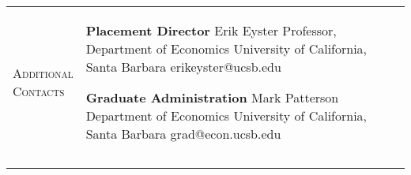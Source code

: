 \documentclass[11pt]{article}
\begin{document}
\begin{tabularx}{\textwidth}{@{}Y Z@{}}
	\textsc{Additional \newline Contacts}  & 
	\begin{minipage}[t]{0.41\textwidth}
		\textbf{Placement Director} \newline
		Erik Eyster \newline
		Professor, Department of Economics \newline
		University of California, Santa Barbara \newline
		erikeyster@ucsb.edu
	\end{minipage}\begin{minipage}[t]{0.5\textwidth}
		\textbf{Graduate Administration} \newline
		Mark Patterson \newline
		Department of Economics \newline
		University of California, Santa Barbara \newline
		grad@econ.ucsb.edu
	\end{minipage}
	\newline  \\ \addlinespace[15pt] 
	
	
	
	
	
	\\ \addlinespace[20pt] 
	


\end{tabularx}
\end{document}
